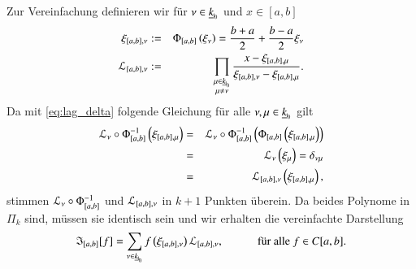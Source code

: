       Zur Vereinfachung definieren wir für $\nu \in \nullhaken{k}$ und $x \in [a,b]$
      \begin{eqnarray*}
	\xi_{[a,b],  \nu} &:=& \Phi_{[a,b]}\left(\xi_\nu\right) = \frac{b + a}{2} + \frac{b - a}{2} \xi_\nu\\
	\lag_{[a,b], \nu} &:=& \prod_{\substack{\mu \in \nullhaken{k} \\ \mu \neq \nu}} \frac{x - \xi_{[a,b],  \mu}}{\xi_{[a,b],  \nu} - \xi_{[a,b],  \mu}}.
      \end{eqnarray*}
      Da mit \autoref{eq:lag_delta} folgende Gleichung für alle $\nu,\mu \in \nullhaken{k}$ gilt
      \begin{eqnarray*}
	 \mathcal{L}_\nu \circ \Phi_{[a,b]}^{-1}\left(\xi_{[a,b],\mu}\right) &=& \mathcal{L}_\nu \circ \Phi_{[a,b]}^{-1} \left( \Phi_{[a,b]}\left(\xi_{[a,b],\mu}\right) \right)\\
							    &=& \mathcal{L}_\nu \left(\xi_\mu\right) = \delta_{\nu\mu}\\
							    &=& \mathcal{L}_{[a,b],\nu}\left( \xi_{[a,b],\mu} \right),
      \end{eqnarray*}
      stimmen $\mathcal{L}_\nu \circ \Phi_{[a,b]}^{-1}$ und $\mathcal{L}_{[a,b],\nu}$ in $k+1$ Punkten überein. Da beides Polynome in $\Pi_k$ sind, müssen sie identisch sein und wir erhalten die vereinfachte
      Darstellung
      \begin{equation*}
	\mathfrak{I}_{[a,b]}[f] = \sum_{\nu \in \nullhaken{k}} f\left(\xi_{[a,b],\nu}\right) \lag_{[a,b],\nu}, \ \ \ \ \ \ \ \ \ \ \ \ \text{für alle } f \in C[a,b].
      \end{equation*}
      
